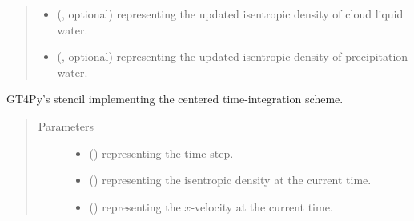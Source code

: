 \documentclass[letterpaper,10pt,english]{sphinxmanual}
\begin{document}
\begin{fulllineitems}
\begin{fulllineitems}
\begin{quote}
\begin{description}
\begin{itemize}
\item {} 
 (, optional) \textendash{}  representing the updated isentropic density of cloud liquid water.

\item {} 
 (, optional) \textendash{}  representing the updated isentropic density of precipitation water.

\end{itemize}


\end{description}\end{quote}

\end{fulllineitems}


\begin{fulllineitems}
\label{\detokenize{api:dycore.prognostic_isentropic_centered.PrognosticIsentropicCentered._stencil_stepping_by_neglecting_vertical_advection_defs}}
GT4Py’s stencil implementing the centered time-integration scheme.
\begin{quote}\begin{description}
\item[{Parameters}] \leavevmode\begin{itemize}
\item {} 
 () \textendash{}  representing the time step.

\item {} 
 () \textendash{}  representing the isentropic density at the current time.

\item {} 
 () \textendash{}  representing the \(x\)-velocity at the current time.


\end{itemize}
\end{description}
\end{quote}
\end{fulllineitems}
\end{fulllineitems}
\end{document}
